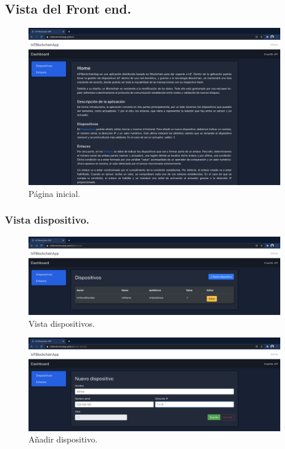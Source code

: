 \subsection{Vista del Front end.}

\begin{figure}[h!]
  \centering
  \includegraphics[width=\textwidth]{imagenes/desarrollo/web/pagina_inicial}
  \caption{Página inicial.}
  \label{fig:pagina-inicial}
\end{figure}

\subsubsection*{Vista dispositivo.}

\begin{figure}[h!]
  \centering
  \includegraphics[width=\textwidth]{imagenes/desarrollo/web/vista_dispositivos}
  \caption{Vista dispositivos.}
  \label{fig:vista-dispositivo}
\end{figure}

\begin{figure}[h!]
 \centering
  \includegraphics[width=\textwidth]{imagenes/desarrollo/web/aniadir_dispositivo}
  \caption{Añadir dispositivo.}
  \label{fig:aniadir-dispositivo}
\end{figure}

